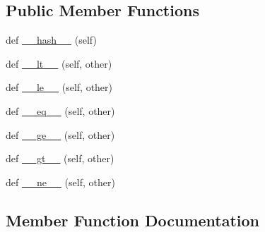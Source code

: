 \subsection*{Public Member Functions}
\begin{DoxyCompactItemize}
\item 
def \hyperlink{classpkg__resources_1_1__vendor_1_1packaging_1_1version_1_1__BaseVersion_a12e90ca37b8bdb6cb0e76418fe1cd2d5}{\+\_\+\+\_\+hash\+\_\+\+\_\+} (self)
\item 
def \hyperlink{classpkg__resources_1_1__vendor_1_1packaging_1_1version_1_1__BaseVersion_a9de5dc61282a0ebcdebfb51f21db3a67}{\+\_\+\+\_\+lt\+\_\+\+\_\+} (self, other)
\item 
def \hyperlink{classpkg__resources_1_1__vendor_1_1packaging_1_1version_1_1__BaseVersion_a33fd377a1abd86fe7b248798542b7bbe}{\+\_\+\+\_\+le\+\_\+\+\_\+} (self, other)
\item 
def \hyperlink{classpkg__resources_1_1__vendor_1_1packaging_1_1version_1_1__BaseVersion_aa7df680623586d3963b9ea276e73a6e2}{\+\_\+\+\_\+eq\+\_\+\+\_\+} (self, other)
\item 
def \hyperlink{classpkg__resources_1_1__vendor_1_1packaging_1_1version_1_1__BaseVersion_ab70e84262e778d55f03e0faca98d37ba}{\+\_\+\+\_\+ge\+\_\+\+\_\+} (self, other)
\item 
def \hyperlink{classpkg__resources_1_1__vendor_1_1packaging_1_1version_1_1__BaseVersion_a90615e99a9d83c8434923bfe763d598c}{\+\_\+\+\_\+gt\+\_\+\+\_\+} (self, other)
\item 
def \hyperlink{classpkg__resources_1_1__vendor_1_1packaging_1_1version_1_1__BaseVersion_a13ddf24975b4e331cdbfbd7fd9513496}{\+\_\+\+\_\+ne\+\_\+\+\_\+} (self, other)
\end{DoxyCompactItemize}


\subsection{Member Function Documentation}
\mbox{\label{classpkg__resources_1_1__vendor_1_1packaging_1_1version_1_1__BaseVersion_aa7df680623586d3963b9ea276e73a6e2}} 
